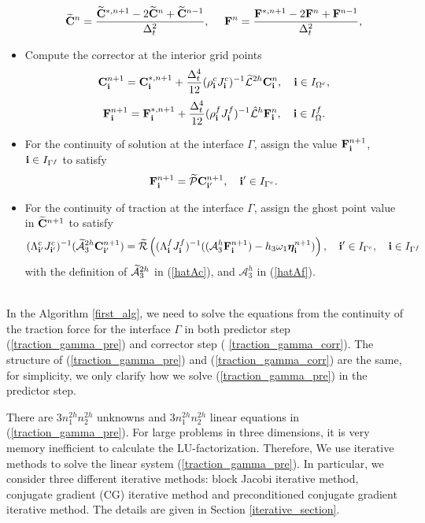 \begin{breakablealgorithm}
\begin{itemize}
{			\begin{equation*}
			\widetilde{\bf C}^n= \frac{\widetilde{\bf C}^{*,n+1}-2\widetilde{\bf C}^{n}+\widetilde{\bf C}^{n-1}}{\Delta^2_t},\ \ \ \
			{\bf F}^{n} = \frac{{\bf F}^{*,n+1}-2{\bf F}^{n}+{\bf F}^{n-1}}{\Delta^2_t},
			\end{equation*}
		}
		\item{Compute the corrector at the interior grid points
			\[{\bf C}^{n+1}_{\bf i} = {\bf C}^{*,n+1}_{\bf i} + \frac{\Delta_t^4}{12}(\rho^{c}_{\bf i}J^c_{\bf i})^{-1}\widetilde{\mathcal{L}}^{2h}{\bf{C}}^{n}_{\bf i},\quad {\bf i}\in I_{\Omega^c},\]
			\[{\bf F}^{n+1}_{\bf i} = {\bf F}^{*,n+1}_{\bf i} + \frac{\Delta_t^4}{12}(\rho^{f}_{\bf i}J^f_{\bf i})^{-1}\hat{\mathcal{L}}^{h}{\bf{F}}^{n}_{\bf i},\quad {\bf i}\in I_\Omega^f.\]
		}
		\item{For the continuity of solution at the interface $\Gamma$, assign the value ${\bf F}^{n+1}_{\bf i}$, ${\bf i}\in I_{\Gamma^f}$ to satisfy
			\begin{equation*}
			{\bf F}^{n+1}_{\bf i} = \widetilde{\mathcal{P}}{\bf C}^{n+1}_{{\bf i}'}, \quad {{\bf i}'}\in I_{\Gamma^c}.
			\end{equation*}
		}
		\item{For the continuity of traction at the interface $\Gamma$, assign the ghost point value in $\widetilde{\bf C}^{n+1}$ to satisfy
			\begin{equation}\label{traction_gamma_corr}
			({\Lambda}^{c}_{{\bf i}'}{J}_{{\bf i}'}^{c})^{-1}(\wt{\mathcal{A}}_3^{2h}{\bf C}^{n+1}_{{\bf i}'})
			= \wt{\mathcal{R}}\left(({\Lambda}^{f}_{\bf i}{ J}^f_{\bf i})^{-1}((\mathcal{A}_3^h{\bf F}^{n+1}_{\bf i})-h_3\omega_1{\bm \eta}^{n+1}_{\bf i})\right), \quad {{\bf i}'}\in I_{\Gamma^c}, \quad {\bf i}\in I_{\Gamma^f}
			\end{equation}
			with the definition of $\widetilde{\mathcal{A}}_3^{2h}$ in (\ref{hatAc}), and $\mathcal{A}_3^h$ in (\ref{hatAf}).
		}
	\end{itemize}
\end{breakablealgorithm}
~\\

In the Algorithm \ref{first_alg}, we need to solve the equations from the continuity of the traction force for the interface $\Gamma$ in both predictor step (\ref{traction_gamma_pre}) and corrector step (
\ref{traction_gamma_corr}). The structure of (\ref{traction_gamma_pre}) and (\ref{traction_gamma_corr}) are the same, for simplicity, we only clarify how we solve (\ref{traction_gamma_pre}) in the predictor step.

There are $3n_1^{2h}n_2^{2h}$ unknowns and $3n_1^{2h}n_2^{2h}$ linear equations in (\ref{traction_gamma_pre}). For large problems in three dimensions, it is very memory inefficient to calculate the LU-factorization. Therefore, We use iterative methods to solve the linear system (\ref{traction_gamma_pre}). In particular, we consider three different iterative methods: block Jacobi iterative method, conjugate gradient (CG) iterative method and preconditioned conjugate gradient iterative method. The details are given in Section \ref{iterative_section}.
